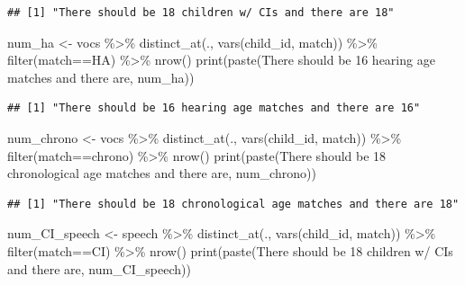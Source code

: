 \documentclass[
]{article}
\newenvironment{Shaded}{\begin{snugshade}}{\end{snugshade}}
\newcommand{\FunctionTok}[1]{\textcolor[rgb]{0.00,0.00,0.00}{#1}}
\newcommand{\NormalTok}[1]{#1}
\newcommand{\OtherTok}[1]{\textcolor[rgb]{0.56,0.35,0.01}{#1}}
\newcommand{\SpecialCharTok}[1]{\textcolor[rgb]{0.00,0.00,0.00}{#1}}
\newcommand{\StringTok}[1]{\textcolor[rgb]{0.31,0.60,0.02}{#1}}
\begin{document}
\begin{verbatim}
## [1] "There should be 18 children w/ CIs and there are 18"
\end{verbatim}

\begin{Shaded}
\begin{Highlighting}[]
\NormalTok{num\_ha }\OtherTok{\textless{}{-}}\NormalTok{ vocs }\SpecialCharTok{\%\textgreater{}\%} 
  \FunctionTok{distinct\_at}\NormalTok{(., }\FunctionTok{vars}\NormalTok{(child\_id, match)) }\SpecialCharTok{\%\textgreater{}\%}
  \FunctionTok{filter}\NormalTok{(match}\SpecialCharTok{==}\StringTok{\textquotesingle{}HA\textquotesingle{}}\NormalTok{) }\SpecialCharTok{\%\textgreater{}\%}
  \FunctionTok{nrow}\NormalTok{()}
\FunctionTok{print}\NormalTok{(}\FunctionTok{paste}\NormalTok{(}\StringTok{\textquotesingle{}There should be 16 hearing age matches and there are\textquotesingle{}}\NormalTok{, num\_ha)) }
\end{Highlighting}
\end{Shaded}

\begin{verbatim}
## [1] "There should be 16 hearing age matches and there are 16"
\end{verbatim}

\begin{Shaded}
\begin{Highlighting}[]
\NormalTok{num\_chrono }\OtherTok{\textless{}{-}}\NormalTok{ vocs }\SpecialCharTok{\%\textgreater{}\%} 
  \FunctionTok{distinct\_at}\NormalTok{(., }\FunctionTok{vars}\NormalTok{(child\_id, match)) }\SpecialCharTok{\%\textgreater{}\%} 
  \FunctionTok{filter}\NormalTok{(match}\SpecialCharTok{==}\StringTok{\textquotesingle{}chrono\textquotesingle{}}\NormalTok{) }\SpecialCharTok{\%\textgreater{}\%}
  \FunctionTok{nrow}\NormalTok{()}
\FunctionTok{print}\NormalTok{(}\FunctionTok{paste}\NormalTok{(}\StringTok{\textquotesingle{}There should be 18 chronological age matches and there are\textquotesingle{}}\NormalTok{, num\_chrono))}
\end{Highlighting}
\end{Shaded}

\begin{verbatim}
## [1] "There should be 18 chronological age matches and there are 18"
\end{verbatim}

\begin{Shaded}
\begin{Highlighting}[]
\NormalTok{num\_CI\_speech }\OtherTok{\textless{}{-}}\NormalTok{ speech }\SpecialCharTok{\%\textgreater{}\%} 
  \FunctionTok{distinct\_at}\NormalTok{(., }\FunctionTok{vars}\NormalTok{(child\_id, match)) }\SpecialCharTok{\%\textgreater{}\%}
  \FunctionTok{filter}\NormalTok{(match}\SpecialCharTok{==}\StringTok{\textquotesingle{}CI\textquotesingle{}}\NormalTok{) }\SpecialCharTok{\%\textgreater{}\%}
  \FunctionTok{nrow}\NormalTok{()}
\FunctionTok{print}\NormalTok{(}\FunctionTok{paste}\NormalTok{(}\StringTok{\textquotesingle{}There should be 18 children w/ CIs and there are\textquotesingle{}}\NormalTok{, num\_CI\_speech))}
\end{Highlighting}
\end{Shaded}
\end{document}

